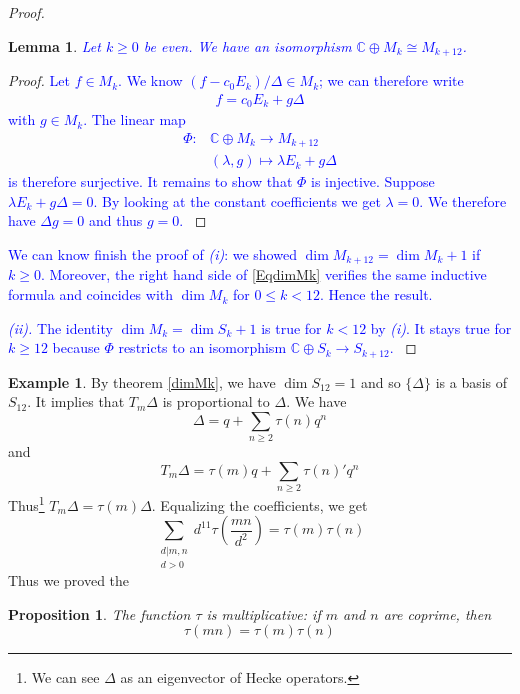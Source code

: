 \documentclass[12pt,a4paper,english]{article}
\theoremstyle{plain}
\newtheorem{lem}[thm]{Lemma}
\newtheorem{prop}[thm]{Proposition}
\theoremstyle{definition}
\newtheorem*{ex}{Example}
\begin{document}
\begin{proof}
\begin{lem}
\textcolor{blue}{
Let $k\geqslant 0$ be even. We have an isomorphism $\mathbb{C}\oplus M_{k}\cong M_{k+12}$.
}
\end{lem}
\begin{proof}
\textcolor{blue}{
Let $f\in M_k$. We know $(f-c_0 E_k)/\Delta\in M_{k}$; we can therefore write
\begin{align*}
f=c_0 E_k+g\Delta
\end{align*}
with $g\in M_{k}$. The linear map
\begin{align*}
\Phi:& \mathbb{C}\oplus M_{k}\to M_{k+12} \\
&(\lambda,g) \mapsto \lambda E_k+g\Delta
\end{align*}
is therefore surjective. It remains to show that $\Phi$ is injective. Suppose $\lambda E_k+g\Delta=0$. By looking at the constant coefficients we get $\lambda=0$. We therefore have $\Delta g=0$ and thus $g=0$. 
}
\end{proof}
\vspace{0.5cm}

\textcolor{blue}{
We can know finish the proof of \textit{(i)}: we showed $\dim M_{k+12}=\dim M_{k}+1$ if $k\geqslant 0$. Moreover, the right hand side of \eqref{EqdimMk} verifies the same inductive formula and coincides with $\dim M_k$ for $0\leqslant k<12$. Hence the result.
}
\vspace{1cm}

\textcolor{blue}{
\textit{(ii).} The identity $\dim M_k=\dim S_k+1$ is true for $k< 12$ by \textit{(i)}. It stays true for $k\geqslant 12$ because $\Phi$ restricts to an isomorphism $\mathbb{C}\oplus S_{k}\to S_{k+12}$.
}
\end{proof}


\begin{ex}
By theorem \ref{dimMk}, we have $\dim S_{12}=1$ and so $\{\Delta\}$ is a basis of $S_{12}$. It implies that $T_m\Delta$ is proportional to $\Delta$. We have
\begin{equation*}
    \Delta=q+\sum_{n\geqslant 2}\tau(n)q^n
\end{equation*}
and 
\begin{equation*}
    T_m\Delta=\tau(m)q+\sum_{n\geqslant 2}\tau(n)'q^n
\end{equation*}
Thus\footnote{We can see $\Delta$ as an eigenvector of Hecke operators.} $T_m\Delta=\tau(m)\Delta$. Equalizing the coefficients, we get
\begin{equation*}
    \sum_{\substack{d\vert m,n\\
                  d>0}}
        d^{11}\tau\left(\frac{mn}{d^2}\right)=\tau(m)\tau(n)
\end{equation*}
Thus we proved the
\begin{prop}
The function $\tau$ is multiplicative:
if $m$ and $n$ are coprime, then
\begin{equation*}
    \tau(mn)=\tau(m)\tau(n)
\end{equation*}
\end{prop}
\end{ex}
\end{document}
